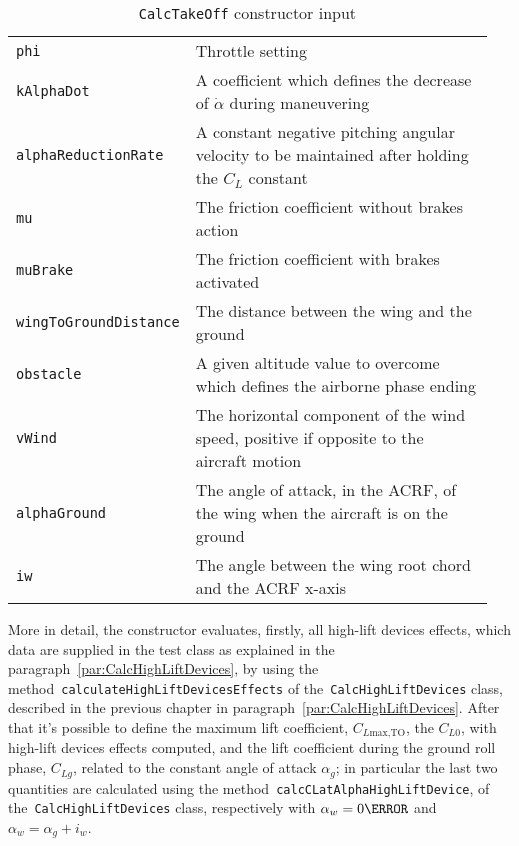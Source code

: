 \begin{table}[!t]
{\begin{tabular}{p{0.25\linewidth}p{0.7\linewidth}}
\lstinline[language=Java]!phi! & Throttle setting \\  [0.18cm]
\lstinline[language=Java]!kAlphaDot! & A coefficient which defines the decrease of $\dot\alpha$ during maneuvering \\ [0.18cm]
\lstinline[language=Java]!alphaReductionRate! & A constant negative pitching angular velocity to be maintained after holding the $C_L$ constant \\ [0.18cm]
\lstinline[language=Java]!mu! & The friction coefficient without brakes action \\ [0.18cm]
\lstinline[language=Java]!muBrake! & The friction coefficient with brakes activated \\ [0.18cm]
\lstinline[language=Java]!wingToGroundDistance! & The distance between the wing and the ground  \\ [0.18cm]
\lstinline[language=Java]!obstacle! & A given altitude value to overcome which defines the airborne phase ending \\ [0.18cm]
\lstinline[language=Java]!vWind! & The horizontal component of the wind speed, positive if opposite to the aircraft motion \\ [0.18cm]
\lstinline[language=Java]!alphaGround! & The angle of attack, in the \gls{ACRF}, of the wing when the aircraft is on the ground \\ [0.18cm]
\lstinline[language=Java]!iw! & The angle between the wing root chord and the \gls{ACRF} x-axis \\ 
\bottomrule
\end{tabular}
}
\caption{\lstinline[language=Java]!CalcTakeOff! constructor input}
\label{table:CalcTakeOffInput}
\end{table}
%
More in detail, the constructor evaluates, firstly, all high-lift devices effects, which data are supplied in the test class as explained in the paragraph~\ref{par:CalcHighLiftDevices}, by using the method~\lstinline[language=Java]!calculateHighLiftDevicesEffects! of the~\lstinline[language=Java]!CalcHighLiftDevices! class, described in the previous chapter in paragraph~\ref{par:CalcHighLiftDevices}. After that it's possible to define the maximum lift coefficient, $C_{L\text{max,TO}}$, the $C_{L0}$, with high-lift devices effects computed, and the lift coefficient during the ground roll phase, $C_{Lg}$, related to the constant angle of attack $\alpha_g$; in particular the last two quantities are calculated using the method~\lstinline[language=Java]!calcCLatAlphaHighLiftDevice!, of the~\lstinline[language=Java]!CalcHighLiftDevices! class, respectively with $\alpha_w=0\degree$ and  $\alpha_w=\alpha_g+i_w$.
